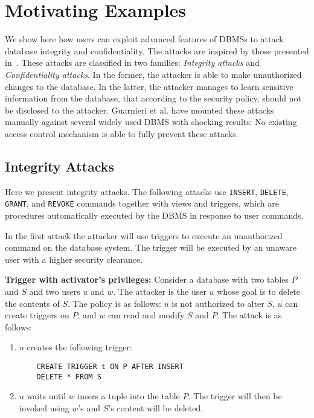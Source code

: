 \section{Motivating Examples}

We show here how users can exploit advanced features of DBMSs to attack database integrity and confidentiality. 
%
The attacks are inspired by those presented in~\cite{guarnieri2016strong}.
%
These attacks are classified in two families: \emph{Integrity attacks} and \emph{Confidentiality attacks}.
%
In the former, the attacker is able to make unauthorized changes to the database. %
%
In the latter, the attacker manages to learn sensitive information from the database, that according to the security policy, should not be disclosed to the attacker.
%
Guarnieri et al. have mounted these attacks manually against several widely used DBMS with shocking results: No existing access control mechanism is able to fully prevent these attacks.


\subsection{Integrity Attacks}

Here we present integrity attacks. 
%
The following attacks use \texttt{INSERT}, \texttt{DELETE}, \texttt{GRANT}, and \texttt{REVOKE} commands together with views and triggers, which are procedures automatically executed by the DBMS in response to user commands.

In the first attack the attacker will use triggers to execute an unauthorized command on the database system. The trigger will be executed by an unaware user with a higher security clearance.

\begin{attack}
{\bf Trigger with activator's privileges:}
Consider a database with two tables $P$ and $S$ and two users $u$ and $w$. The attacker is the user $u$ whose goal is to delete the contents of $S$. The policy is as follows: $u$ is not authorized to alter $S$, $u$ can create triggers on $P$, and $w$ can read and modify $S$ and $P$. The attack is as follows:
\begin{enumerate}
\item $u$ creates the following trigger:
	\begin{verbatim}
	CREATE TRIGGER t ON P AFTER INSERT
    DELETE * FROM S
	\end{verbatim}
\item $u$ waits until $w$ insers a tuple into the table $P$. The trigger will then be invoked using $w$'s and $S$'s content will be deleted.
\end{enumerate}
\end{attack}

